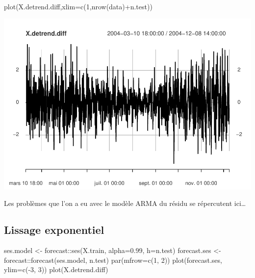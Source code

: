 \documentclass[
]{article}
\newenvironment{Shaded}{\begin{snugshade}}{\end{snugshade}}
\newcommand{\AttributeTok}[1]{\textcolor[rgb]{0.77,0.63,0.00}{#1}}
\newcommand{\DecValTok}[1]{\textcolor[rgb]{0.00,0.00,0.81}{#1}}
\newcommand{\FloatTok}[1]{\textcolor[rgb]{0.00,0.00,0.81}{#1}}
\newcommand{\FunctionTok}[1]{\textcolor[rgb]{0.00,0.00,0.00}{#1}}
\newcommand{\NormalTok}[1]{#1}
\newcommand{\OtherTok}[1]{\textcolor[rgb]{0.56,0.35,0.01}{#1}}
\newcommand{\SpecialCharTok}[1]{\textcolor[rgb]{0.00,0.00,0.00}{#1}}
\begin{document}
\begin{Shaded}
\begin{Highlighting}[]
\FunctionTok{plot}\NormalTok{(X.detrend.diff,}\AttributeTok{xlim=}\FunctionTok{c}\NormalTok{(}\DecValTok{1}\NormalTok{,}\FunctionTok{nrow}\NormalTok{(data)}\SpecialCharTok{+}\NormalTok{n.test))}
\end{Highlighting}
\end{Shaded}

\includegraphics{STA202_report_files/figure-latex/ARMA.predict-2.pdf}

Les problèmes que l'on a eu avec le modèle ARMA du résidu se répercutent
ici\ldots{}

\hypertarget{lissage-exponentiel}{%
\subsection{Lissage exponentiel}\label{lissage-exponentiel}}

\begin{Shaded}
\begin{Highlighting}[]
\NormalTok{ses.model }\OtherTok{\textless{}{-}}\NormalTok{ forecast}\SpecialCharTok{::}\FunctionTok{ses}\NormalTok{(X.train, }\AttributeTok{alpha=}\FloatTok{0.99}\NormalTok{, }\AttributeTok{h=}\NormalTok{n.test)}
\NormalTok{forecast.ses }\OtherTok{\textless{}{-}}\NormalTok{ forecast}\SpecialCharTok{::}\FunctionTok{forecast}\NormalTok{(ses.model, n.test)}
\FunctionTok{par}\NormalTok{(}\AttributeTok{mfrow=}\FunctionTok{c}\NormalTok{(}\DecValTok{1}\NormalTok{, }\DecValTok{2}\NormalTok{))}
\FunctionTok{plot}\NormalTok{(forecast.ses, }\AttributeTok{ylim=}\FunctionTok{c}\NormalTok{(}\SpecialCharTok{{-}}\DecValTok{3}\NormalTok{, }\DecValTok{3}\NormalTok{))}
\FunctionTok{plot}\NormalTok{(X.detrend.diff)}
\end{Highlighting}
\end{Shaded}
\end{document}
